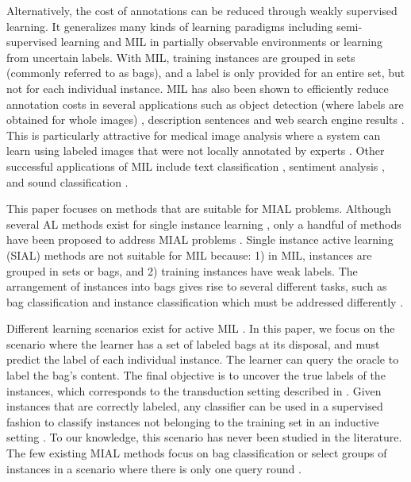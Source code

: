 \documentclass{article}
\begin{document}
Alternatively, the cost of annotations can be reduced through weakly supervised learning. It generalizes many kinds of learning paradigms including semi-supervised learning and MIL in partially observable environments or learning from uncertain labels. With MIL, training instances are grouped in sets (commonly referred to as bags), and a label is only provided for an entire set, but not for each individual instance. MIL has also been shown to efficiently reduce annotation costs in several applications such as object detection (where labels are obtained for whole images) \cite{Ren2016}, description sentences \cite{Xu2016Vid,Karpathy2015,Fang2015} and web search engine results \cite{Zhu2015objDisc}. This is particularly attractive for medical image analysis where a system can learn using labeled images that were not locally annotated by experts \cite{Quellec2017}. Other successful applications of MIL include text classification \cite{Ray2005,Zhang2013MI2LS}, sentiment analysis \cite{Kotzias2015kdd}, and sound classification \cite{Briggs2012}.

This paper focuses on methods that are suitable for MIAL problems. Although several AL methods exist for single instance learning \cite{Settles2009survey}, only a handful of methods have been proposed to address MIAL problems \cite{Meessen2007,Settles2008,Zhang2010AMIL,Melendez2016AMIL}. Single instance active learning (SIAL) methods are not suitable for MIL because: 1) in MIL, instances are grouped in sets or bags, and 2) training instances have weak labels. The arrangement of instances into bags gives rise to several different tasks, such as bag classification and instance classification which must be addressed differently \cite{Carbonneau2016Survey}.  

Different learning scenarios exist for active MIL \cite{Settles2008}. In this paper, we focus on the scenario where the learner has a set of labeled bags at its disposal, and must predict the label of each individual instance. The learner can query the oracle to label the bag's content. The final objective is to uncover the true labels of the instances, which corresponds to the transduction setting described in \cite{Garcia2011degrees}. Given instances that are correctly labeled, any classifier can be used in a supervised fashion to classify instances not belonging to the training set in an inductive setting \cite{Garcia2011degrees}. To our knowledge, this scenario has never been studied in the literature. The few existing MIAL methods focus on bag classification \cite{Meessen2007,Settles2008,Zhang2010AMIL} or select groups of instances in a scenario where there is only one query round \cite{Melendez2016AMIL}. 
\end{document}
